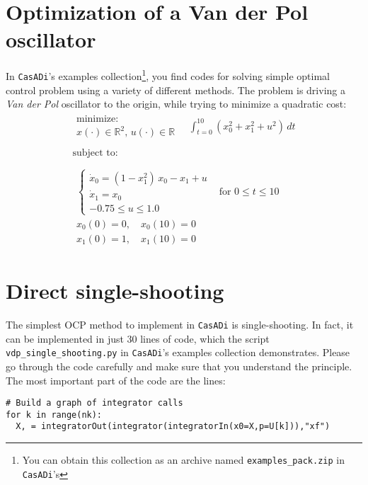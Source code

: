 \documentclass[a4paper,12pt]{book}
\newcommand{\CasADi}{\texttt{CasADi}\xspace}
\begin{document}
\section{Optimization of a Van der Pol oscillator}
In \CasADi's examples collection\footnote{You can obtain this collection as an archive named \texttt{examples\_pack.zip} in \CasADi's }, you find codes for solving simple optimal control problem using a variety of different methods. The problem is driving a \emph{Van der Pol} oscillator to the origin, while trying to minimize a quadratic cost:
\begin{equation}
\begin{array}{lc}
\begin{array}{l}
\text{minimize:} \\
x(\cdot) \in \mathbb{R}^2, \, u(\cdot) \in \mathbb{R}
\end{array}
\quad \displaystyle \int_{t=0}^{10}{(x_0^2 + x_1^2 + u^2) \, dt}
\\
\\
\text{subject to:} \\
\\
\begin{array}{ll}
\left\{
\begin{array}{l}
\dot{x}_0 = (1-x_1^2) \, x_0 - x_1 + u \\
\dot{x}_1 = x_0 \\
-0.75 \le u \le 1.0
\end{array} \right. & \text{for $0 \le t \le 10$} \\
x_0(0)=0, \quad x_0(10)=0  \\
x_1(0)=1, \quad x_1(10)=0  
\end{array}
\end{array}
\label{eq:vdp}
\end{equation}

\section{Direct single-shooting}
The simplest OCP method to implement in \CasADi is single-shooting. In fact, it can be implemented in just 30 lines of code, which the script {\texttt{vdp\_single\_shooting.py}} in \CasADi's examples collection demonstrates. Please go through the code carefully and make sure that you understand the principle. The most important part of the code are the lines:
\begin{verbatim}
# Build a graph of integrator calls
for k in range(nk):
  X, = integratorOut(integrator(integratorIn(x0=X,p=U[k])),"xf")
\end{verbatim}
\end{document}
